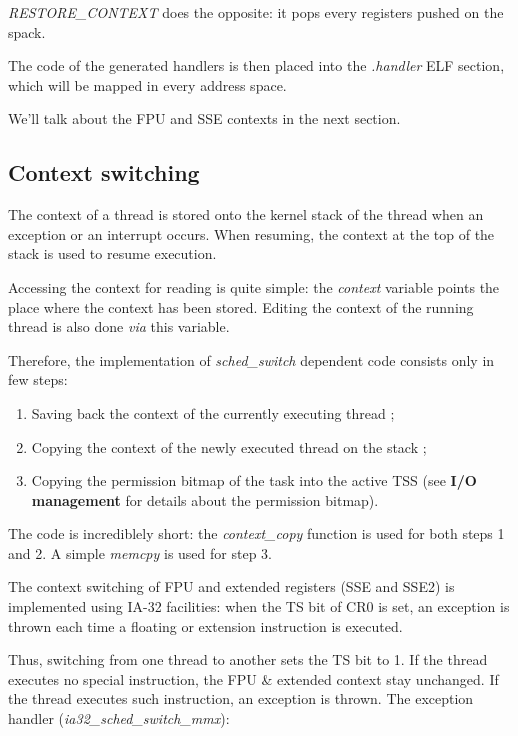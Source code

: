 \textit{RESTORE\_CONTEXT} does the opposite: it pops every registers
pushed on the spack.

The code of the generated handlers is then placed into the
\textit{.handler} ELF section, which will be mapped in every address
space.

We'll talk about the FPU and SSE contexts in the next section.

%
%

\subsection{Context switching}

The context of a thread is stored onto the kernel stack of the thread
when an exception or an interrupt occurs. When resuming, the context
at the top of the stack is used to resume execution.

Accessing the context for reading is quite simple: the
\textit{context} variable points the place where the context has been
stored. Editing the context of the running thread is also done
\textit{via} this variable.

Therefore, the implementation of \textit{sched\_switch} dependent code
consists only in few steps:

\begin{enumerate}
\item Saving back the context of the currently executing thread ;
\item Copying the context of the newly executed thread on the stack ;
\item Copying the permission bitmap of the task into the active TSS
(see \textbf{I/O management} for details about the permission bitmap).
\end{enumerate}

The code is incrediblely short: the \textit{context\_copy} function is
used for both steps 1 and 2. A simple \textit{memcpy} is used for step
3.

The context switching of FPU and extended registers (SSE and SSE2) is
implemented using IA-32 facilities: when the TS bit of CR0 is set, an
exception is thrown each time a floating or extension instruction is
executed.

Thus, switching from one thread to another sets the TS bit to 1. If
the thread executes no special instruction, the FPU \& extended context
stay unchanged. If the thread executes such instruction, an exception
is thrown. The exception handler (\textit{ia32\_sched\_switch\_mmx}):

